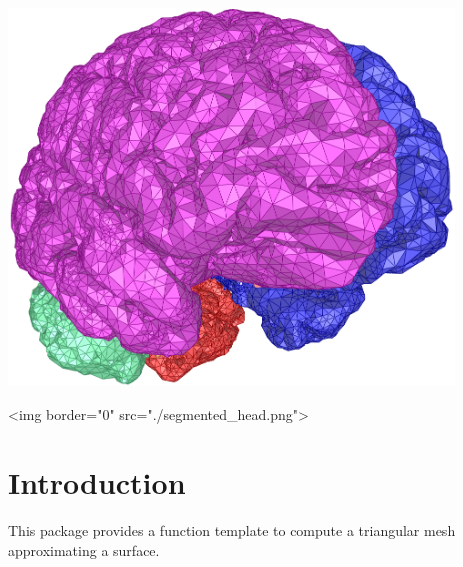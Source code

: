 


\minitoc


\begin{center}
 \begin{ccTexOnly}
   \includegraphics[height=10cm]{Surface_mesher/segmented_head}
 \end{ccTexOnly}
 \begin{ccHtmlOnly}
   <img border="0" src="./segmented_head.png">
 \end{ccHtmlOnly}
\end{center}

\section{Introduction\label{SurfaceMesher_section_intro}}

This package provides a function template
to compute a triangular mesh approximating a surface.

